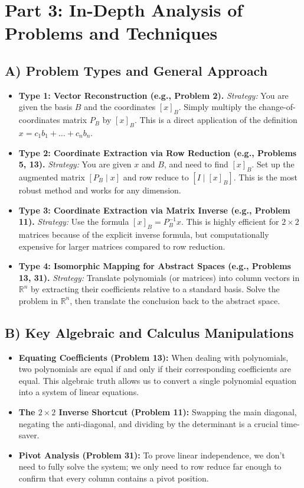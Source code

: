 \documentclass[11pt]{article}
\begin{document}
\newpage
\section{Part 3: In-Depth Analysis of Problems and Techniques}

\subsection{A) Problem Types and General Approach}
\begin{itemize}
    \item \textbf{Type 1: Vector Reconstruction (e.g., Problem 2).} 
    \textit{Strategy:} You are given the basis $B$ and the coordinates $[x]_B$. Simply multiply the change-of-coordinates matrix $P_B$ by $[x]_B$. This is a direct application of the definition $x = c_1 b_1 + \dots + c_n b_n$.
    
    \item \textbf{Type 2: Coordinate Extraction via Row Reduction (e.g., Problems 5, 13).} 
    \textit{Strategy:} You are given $x$ and $B$, and need to find $[x]_B$. Set up the augmented matrix $[P_B \mid x]$ and row reduce to $[I \mid [x]_B]$. This is the most robust method and works for any dimension.
    
    \item \textbf{Type 3: Coordinate Extraction via Matrix Inverse (e.g., Problem 11).} 
    \textit{Strategy:} Use the formula $[x]_B = P_B^{-1} x$. This is highly efficient for $2 \times 2$ matrices because of the explicit inverse formula, but computationally expensive for larger matrices compared to row reduction.
    
    \item \textbf{Type 4: Isomorphic Mapping for Abstract Spaces (e.g., Problems 13, 31).} 
    \textit{Strategy:} Translate polynomials (or matrices) into column vectors in $\mathbb{R}^n$ by extracting their coefficients relative to a standard basis. Solve the problem in $\mathbb{R}^n$, then translate the conclusion back to the abstract space.
\end{itemize}

\subsection{B) Key Algebraic and Calculus Manipulations}
\begin{itemize}
    \item \textbf{Equating Coefficients (Problem 13):} When dealing with polynomials, two polynomials are equal if and only if their corresponding coefficients are equal. This algebraic truth allows us to convert a single polynomial equation into a system of linear equations.
    \item \textbf{The $2 \times 2$ Inverse Shortcut (Problem 11):} Swapping the main diagonal, negating the anti-diagonal, and dividing by the determinant is a crucial time-saver.
    \item \textbf{Pivot Analysis (Problem 31):} To prove linear independence, we don't need to fully solve the system; we only need to row reduce far enough to confirm that every column contains a pivot position.
\end{itemize}
\end{document}
